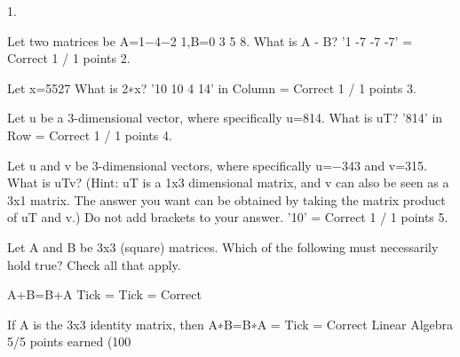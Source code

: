 1.

Let two matrices be A=1−4−2 1,B=0 3 5 8. What is A - B? '1 -7 -7 -7' = Correct 1 / 1 points
2. 

Let x=5527 What is 2∗x? '10 10 4 14' in Column = Correct 1 / 1 points
3. 

Let u be a 3-dimensional vector, where specifically u=814. What is uT? '814' in Row = Correct 1 / 1 points
4. 

Let u and v be 3-dimensional vectors, where specifically u=−343 and v=315.
What is uTv? (Hint: uT is a 1x3 dimensional matrix, and v can also be seen as a 3x1 matrix. The answer you want can be obtained by taking the matrix product of uT and v.) Do not add brackets to your answer. '10' = Correct 1 / 1 points
5. 

Let A and B be 3x3 (square) matrices. Which of the following must necessarily hold true? Check all that apply.

A+B=B+A Tick = Tick = Correct 

If A is the 3x3 identity matrix, then A∗B=B∗A = Tick = Correct  
Linear Algebra
5/5 points earned (100%
